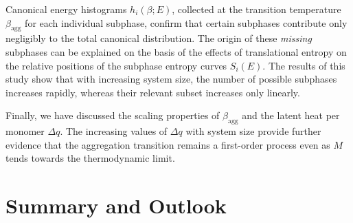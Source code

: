 \documentclass[12pt]{report}
\begin{document}
Canonical energy histograms $h_{i}(\beta;E)$, collected at the transition
temperature $\beta_{\mathrm{agg}}$ for each individual subphase, confirm
that certain subphases contribute only negligibly to the total canonical
distribution. The origin of these \textit{missing} subphases can be
explained on the basis of the effects of translational entropy on the 
relative positions of the subphase entropy curves $S_{i}(E)$. The results
of this study show that with increasing system size, the number of possible
subphases increases rapidly, whereas their relevant subset increases only
linearly. 

Finally, we have discussed the scaling properties of 
$\beta_{\mathrm{agg}}$ and the latent heat per monomer $\Delta q$. The
increasing values of $\Delta q$ with system size provide further evidence
that the aggregation transition remains a first-order process even as $M$
tends towards the thermodynamic limit. 

\chapter{Summary and Outlook}









\begin{thebibliography}{99}
        
\end{thebibliography}
\end{document}
